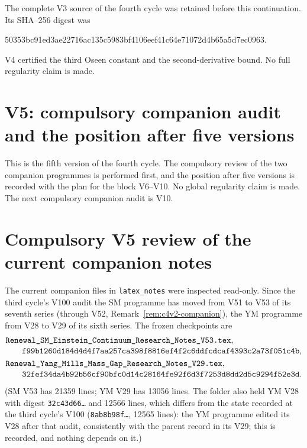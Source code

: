 \documentclass[11pt]{article}
\theoremstyle{plain}
\theoremstyle{definition}
\theoremstyle{remark}
\begin{document}
The complete V3 source of the fourth cycle was retained before this
continuation.  Its SHA--256 digest was
\begin{center}\scriptsize\ttfamily
50353bc91ed3ae22716ac135c5983bf4106eef41c64e71072d4b65a5d7ec0963.
\end{center}
V4 certified the third Oseen constant and the second-derivative
bound.  No full regularity claim is made.

\section{V5: compulsory companion audit and the position after five versions}
\label{sec:c4v5-entry}

This is the fifth version of the fourth cycle.  The compulsory review
of the two companion programmes is performed first, and the position
after five versions is recorded with the plan for the block V6--V10.
No global regularity claim is made.  The next compulsory companion
audit is V10.

\section{Compulsory V5 review of the current companion notes}
\label{sec:c4v5-companion-audit}

The current companion files in \texttt{latex\_notes} were inspected
read-only.  Since the third cycle's V100 audit the SM programme has
moved from V51 to V53 of its seventh series (through V52,
Remark~\ref{rem:c4v2-companion}), the YM programme from V28 to V29 of
its sixth series.  The frozen checkpoints are
\begin{align}
 &\texttt{Renewal\_SM\_Einstein\_Continuum\_Research\_Notes\_V53.tex},
 \notag\\[-2pt]
 &\qquad
 \texttt{f99b1260d184d4d4f7aa257ca398f8816ef4f2c6ddfcdcaf4393c2a73f051c4b},
 \label{eq:c4v5-SM-checkpoint}\\
 &\texttt{Renewal\_Yang\_Mills\_Mass\_Gap\_Research\_Notes\_V29.tex},
 \notag\\[-2pt]
 &\qquad
 \texttt{32fef34da4b92b56cf90bfc0d14c28164fe92f6d3f7253d8dd2d5c9294f52e3d}.
 \label{eq:c4v5-YM-checkpoint}
\end{align}
(SM V53 has 21359 lines; YM V29 has 13056 lines.  The folder also
held YM V28 with digest \texttt{32c43d66\dots} and 12566 lines, which differs
from the state recorded at the third cycle's V100
(\texttt{8ab8b98f\dots}, 12565 lines): the YM programme edited its V28 after
that audit, consistently with the parent record in its V29; this is
recorded, and nothing depends on it.)
\end{document}
